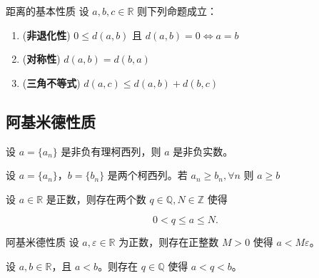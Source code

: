 \begin{theorem}{距离的基本性质}{}
	设 $a,b,c\in \mathbb R$ 则下列命题成立：
	
	\begin{enumerate}
		\item (\textbf{非退化性}) $0\le d(a,b)$ 且 $d(a,b) = 0 \iff a = b$
		\item (\textbf{对称性}) $d(a,b) = d(b, a)$
		\item (\textbf{三角不等式}) $d(a,c) \le d(a,b) + d(b,c)$
	\end{enumerate}
\end{theorem}

\subsection{阿基米德性质}

\begin{proposition}{}{}
	设 $a = \{a_n\}$ 是非负有理柯西列，则 $a$ 是非负实数。
\end{proposition}

\begin{corollary}{}{}
	设 $a = \{a_n\}$，$b = \{b_n\}$ 是两个柯西列。若 $a_n\ge b_n,\forall n$ 则 $a \ge b$
\end{corollary}

\begin{proposition}{}{}
	设 $a\in \mathbb R$ 是正数，则存在两个数 $q\in \mathbb Q, N\in \mathbb Z$ 使得 
	
	$$
	0 < q \le a \le N.
	$$
\end{proposition}

\begin{theorem}{阿基米德性质}{}
	设 $a,\varepsilon \in \mathbb R$ 为正数，则存在正整数 $M > 0$ 使得 $a < M\varepsilon$。
\end{theorem}


\begin{proposition}{}{}
	设 $a,b\in \mathbb R$，且 $a<b$。则存在 $q\in \mathbb Q$ 使得 $a<q<b$。
\end{proposition}














